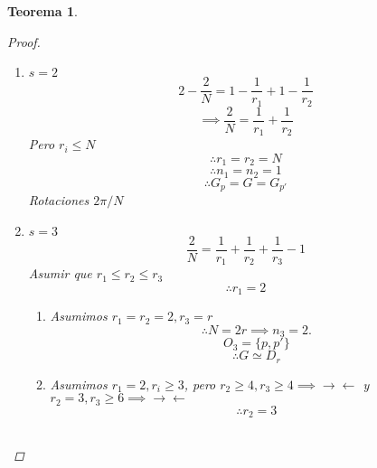 \documentclass[11pt]{book}
\newcommand{\contr}{\rightarrow\leftarrow}
\newtheorem{thm}{Teorema}[section]
\theoremstyle{definition}
\begin{document}
\begin{thm}
\begin{proof}
\begin{enumerate}[label=(\arabic* órbitas):]
			\item $s=2$
			\[2-\frac{2}{N}=1-\frac{1}{r_1}+1-\frac{1}{r_2}\]
			\[\implies\frac{2}{N}=\frac{1}{r_1}+\frac{1}{r_2}\]
			Pero $r_i\leq N$
			\[\therefore r_1=r_2=N\]
			\[\therefore n_1=n_2=1\]
			\[\therefore G_p=G=G_{p'}\]
			Rotaciones $2\pi/N$

			\item $s=3$
			\[\frac{2}{N}=\frac{1}{r_1}+\frac{1}{r_2}+\frac{1}{r_3}-1\]
			Asumir que $r_1\leq r_2\leq r_3$
			\[\therefore r_1=2\]
			\begin{enumerate}[label=(\roman*)]
				\item Asumimos $r_1=r_2=2,r_3=r$
				\[\therefore N=2r\implies n_3=2.\]
				\[O_3=\{p,p'\}\]
				\[\therefore G\simeq D_r\]

				\item Asumimos $r_1=2,r_i\geq 3$, pero $r_2\geq 4, r_3\geq 4\implies \contr$ y $r_2=3, r_3\geq 6\implies \contr$
				\[\therefore r_2=3\]
				\begin{center}
					\begin{tabular}{ c | c | c | c | c | c }
						
					\end{tabular}
				\end{center}
			\end{enumerate}
		\end{enumerate}
	\end{proof}
\end{thm}
\end{document}
